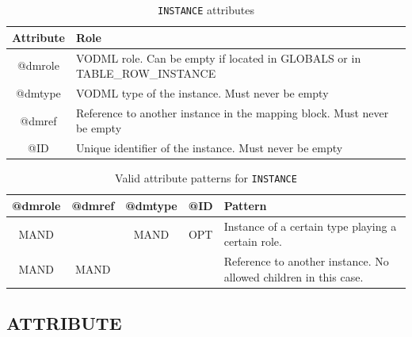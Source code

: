 \documentclass[11pt,a4paper]{ivoa}
\begin{document}
\begin{table}[!h]
\small
\centering
\begin{tabulary}{\linewidth}{|c|J|}       
       \hline 
            \textbf{Attribute} &  
            \textbf{Role}\\
       \hline  
            @dmrole    & 
            VODML role.  \newline Can be empty if located in GLOBALS or in TABLE\_ROW\_INSTANCE \\
       \hline  
            @dmtype & 
            VODML type of the instance.  \newline Must never be empty \\
       \hline  
            @dmref  & 
            Reference to another instance in the mapping block. 
            \newline  Must never be empty\\          
       \hline  
            @ID  & 
            Unique identifier of the instance. 
            \newline  Must never be empty\\
       \hline 
     \end{tabulary}
     \caption{\texttt{INSTANCE} attributes} 
     \label{tbl:inst-att}
 \end{table}

\begin{table}[!h]
\small
\centering
\begin{tabulary}{\linewidth}{|c|c|c|c|J|}
    \hline 
        \textbf{@dmrole} & 
        \textbf{@dmref} &  
        \textbf{@dmtype} &  
        \textbf{@ID} &  
        \textbf{Pattern}\\
    \hline      \hline  
        MAND &   
       & 
       MAND & 
       OPT & 
       Instance of a certain type playing a certain role. \\
    \hline  
       MAND  & 
       MAND  &  
       &  
       & 
       Reference to another instance. 
        \newline  No allowed children in this case.  \\
      \hline 
\end{tabulary}
     \caption{Valid attribute patterns for  \texttt{INSTANCE}} 
     \label{tbl:inst-pattern}
 \end{table}

%
%

\subsection{ATTRIBUTE}
\end{document}
